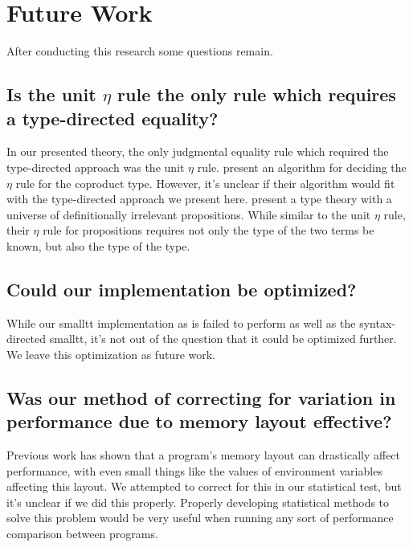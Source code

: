 \section{Future Work}

After conducting this research some questions remain.

\subsection{Is the unit $\eta$ rule the only rule which requires a type-directed equality?}

In our presented theory, the only judgmental equality rule which required the type-directed approach was the unit $\eta$ rule.
\citet{altenkirch2001} present an algorithm for deciding the $\eta$ rule for the coproduct type.
However, it's unclear if their algorithm would fit with the type-directed approach we present here.
\citet{gilbert2019} present a type theory with a universe of definitionally irrelevant propositions.
While similar to the unit $\eta$ rule, their $\eta$ rule for propositions requires not only the type of the two terms be known, but also the type of the type.

\subsection{Could our implementation be optimized?}

While our smalltt implementation as is failed to perform as well as the syntax-directed smalltt, it's not out of the question that it could be optimized further.
We leave this optimization as future work.

\subsection{Was our method of correcting for variation in performance due to memory layout effective?}

Previous work has shown that a program's memory layout can drastically affect performance, with even small things like the values of environment variables affecting this layout.
We attempted to correct for this in our statistical test, but it's unclear if we did this properly.
Properly developing statistical methods to solve this problem would be very useful when running any sort of performance comparison between programs.
